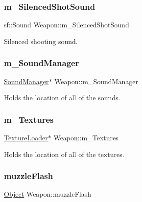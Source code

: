 \subsubsection{\texorpdfstring{m\+\_\+\+Silenced\+Shot\+Sound}{m\_SilencedShotSound}}
{\footnotesize\ttfamily sf\+::\+Sound Weapon\+::m\+\_\+\+Silenced\+Shot\+Sound\hspace{0.3cm}{\ttfamily [private]}}



Silenced shooting sound. 

\mbox{\label{class_weapon_af882c79f972fa2586c755c465897d8d1}} 
\subsubsection{\texorpdfstring{m\+\_\+\+Sound\+Manager}{m\_SoundManager}}
{\footnotesize\ttfamily \hyperlink{class_sound_manager}{Sound\+Manager}$\ast$ Weapon\+::m\+\_\+\+Sound\+Manager\hspace{0.3cm}{\ttfamily [private]}}



Holds the location of all of the sounds. 

\mbox{\label{class_weapon_a13010172b849a0f6cd1e1550ea6a93f9}} 
\subsubsection{\texorpdfstring{m\+\_\+\+Textures}{m\_Textures}}
{\footnotesize\ttfamily \hyperlink{class_texture_loader}{Texture\+Loader}$\ast$ Weapon\+::m\+\_\+\+Textures\hspace{0.3cm}{\ttfamily [private]}}



Holds the location of all of the textures. 

\mbox{\label{class_weapon_a45c4ba5371558dd1245b989c5c26c962}} 
\subsubsection{\texorpdfstring{muzzle\+Flash}{muzzleFlash}}
{\footnotesize\ttfamily \hyperlink{class_object}{Object} Weapon\+::muzzle\+Flash\hspace{0.3cm}{\ttfamily [private]}}



